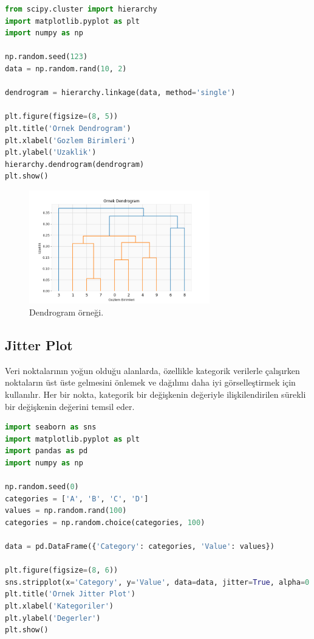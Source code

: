 \begin{lstlisting}[language=Python]
from scipy.cluster import hierarchy
import matplotlib.pyplot as plt
import numpy as np

np.random.seed(123)
data = np.random.rand(10, 2)

dendrogram = hierarchy.linkage(data, method='single')

plt.figure(figsize=(8, 5))
plt.title('Ornek Dendrogram')
plt.xlabel('Gozlem Birimleri')
plt.ylabel('Uzaklik')
hierarchy.dendrogram(dendrogram)
plt.show()
\end{lstlisting}

\begin{figure}[h]
    \centering
    \includegraphics[width=0.7\textwidth]{images/dendrogram.png}
    \caption{Dendrogram örneği.}
    \label{fig:enter-label}
\end{figure}

\newpage

\subsection{Jitter Plot}
Veri noktalarının yoğun olduğu alanlarda, özellikle kategorik verilerle çalışırken noktaların üst üste gelmesini önlemek ve dağılımı daha iyi görselleştirmek için kullanılır. Her bir nokta, kategorik bir değişkenin değeriyle ilişkilendirilen sürekli bir değişkenin değerini temsil eder.

\begin{lstlisting}[language=Python]
import seaborn as sns
import matplotlib.pyplot as plt
import pandas as pd
import numpy as np

np.random.seed(0)
categories = ['A', 'B', 'C', 'D']
values = np.random.rand(100)
categories = np.random.choice(categories, 100)

data = pd.DataFrame({'Category': categories, 'Value': values})

plt.figure(figsize=(8, 6))
sns.stripplot(x='Category', y='Value', data=data, jitter=True, alpha=0.7)
plt.title('Ornek Jitter Plot')
plt.xlabel('Kategoriler')
plt.ylabel('Degerler')
plt.show()
\end{lstlisting}

